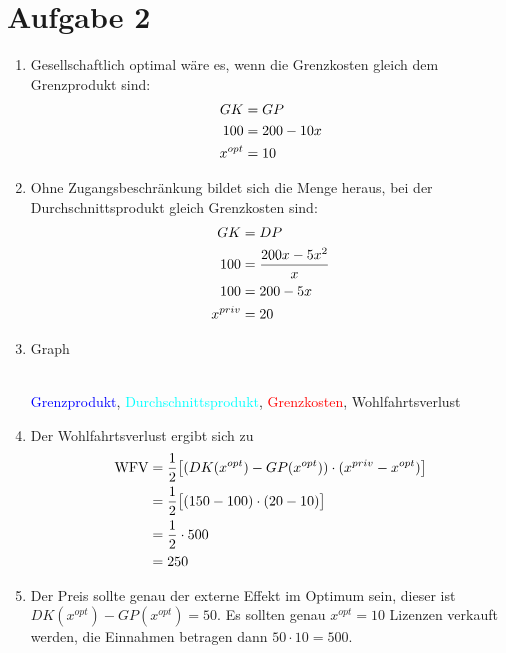 \documentclass{article}
\begin{document}
	\section*{Aufgabe 2}
	\begin{enumerate}[label=(\alph*)]
		\item Gesellschaftlich optimal wäre es, wenn die Grenzkosten gleich dem Grenzprodukt sind:
		\begin{align}
			GK &= GP \notag \\
			100 &= 200-10x \notag \\
			x^{opt} &= 10 \notag
		\end{align}
		\item Ohne Zugangsbeschränkung bildet sich die Menge heraus, bei der Durchschnittsprodukt gleich Grenzkosten sind:
		\begin{align}
			GK &= DP \notag \\
			100 &= \frac{200x-5x^2}{x} \notag \\
			100 &= 200 - 5x \notag \\
			x^{priv} &= 20 \notag
		\end{align}
		\item Graph
		\begin{center}
			 \\
			\textcolor{blue}{Grenzprodukt}, \textcolor{cyan}{Durchschnittsprodukt}, \textcolor{red}{Grenzkosten}, \textcolor{green!80!black}{Wohlfahrtsverlust}
		\end{center}
		\item Der Wohlfahrtsverlust ergibt sich zu
		\begin{align}
			\text{WFV} &= \frac{1}{2}\big[(DK(x^{opt}) - GP(x^{opt}))\cdot (x^{priv} - x^{opt})\big] \notag \\
			&= \frac{1}{2} \big[(150-100) \cdot (20-10)\big] \notag \\
			&= \frac{1}{2}\cdot 500 \notag \\
			&= 250 \notag
		\end{align}
		\item Der Preis sollte genau der externe Effekt im Optimum sein, dieser ist $DK(x^{opt}) - GP(x^{opt}) = 50$. Es sollten genau $x^{opt}=10$ Lizenzen verkauft werden, die Einnahmen betragen dann $50\cdot 10=500$.
	\end{enumerate}
\end{document}
